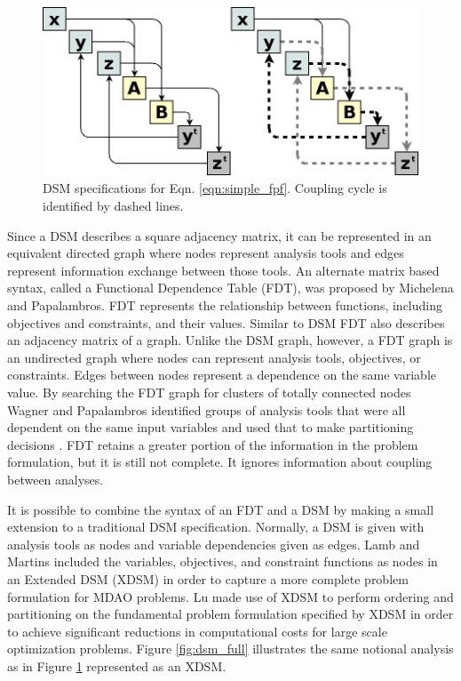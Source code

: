     \begin{figure}[!hbp]
        \begin{center}
        \includegraphics[height=.25\textheight]{images/dsm_simple}
        \caption{DSM specifications for Eqn. \ref{eqn:simple_fpf}. Coupling cycle is identified by dashed lines. \label{fig:dsm_simple}}
        \end{center}
    \end{figure}


    Since a DSM describes a square adjacency matrix, it can be represented in an equivalent directed graph where nodes represent analysis tools and 
    edges represent information exchange between those tools. An alternate matrix based syntax, called a 
    Functional Dependence Table (FDT), was proposed by Michelena and Papalambros. 
    FDT represents the relationship between functions, including objectives and constraints, and their values\cite{Michelena1997}. Similar to DSM
    FDT also describes an adjacency matrix of a graph. Unlike the DSM graph, however, a FDT graph is an undirected 
    graph where nodes can represent analysis tools, objectives, or constraints. Edges between nodes represent a dependence on the same 
    variable value. By searching the FDT graph for clusters of totally connected nodes Wagner and Papalambros identified groups of 
    analysis tools that were all dependent on the same input variables and used that to make partitioning decisions \cite{Wagner1993}. FDT retains 
    a greater portion of the information in the problem formulation, but it is still not complete. It ignores information about coupling 
    between analyses. 

    It is possible to combine the syntax of an FDT and a DSM by making a small extension to a traditional DSM specification. Normally, a DSM is given 
    with analysis tools as nodes and variable dependencies given as edges. Lamb and Martins included the variables, objectives, and constraint functions
    as nodes in an Extended DSM (XDSM)\cite{Lambe2012} in order to capture a more complete problem formulation for MDAO problems. Lu made use of 
    XDSM to perform ordering and partitioning on the fundamental problem formulation specified by XDSM in order to achieve 
    significant reductions in computational costs for large scale optimization problems. Figure \ref{fig:dsm_full} illustrates 
    the same notional analysis as in Figure \ref{fig:dsm_simple} represented as an XDSM.

